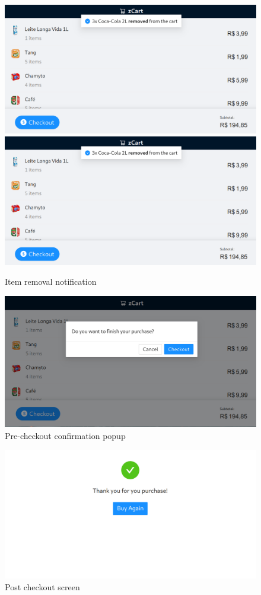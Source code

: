 \documentclass[openright]{normas-utf-tex} %
\begin{document}
\begin{figure}[H]
	\centering
	\includegraphics[width=1\textwidth]{./images/userapp3.png}
	\includegraphics[width=1\textwidth]{./images/userapp3.png}
	\caption[]{Item removal notification}
\end{figure}

\begin{figure}[H]
	\centering
	\includegraphics[width=1\textwidth]{./images/userapp4.png}
	\caption[]{Pre-checkout confirmation popup}
\end{figure}

\begin{figure}[H]
	\centering
	\includegraphics[width=1\textwidth]{./images/userapp5.png}
	\caption[]{Post checkout screen}
\end{figure}
\end{document}
